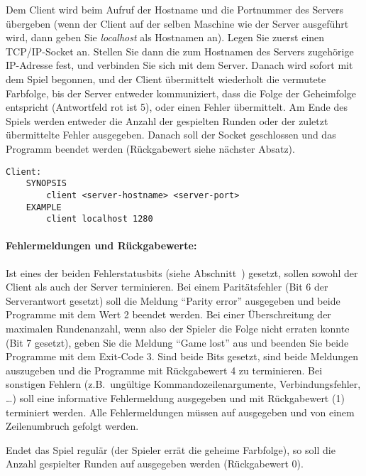 Dem Client wird beim Aufruf der Hostname und die Portnummer des Servers
übergeben (wenn der Client auf der selben Maschine wie der Server ausgeführt
wird, dann geben Sie \emph{localhost} als Hostnamen an). Legen Sie zuerst einen
TCP/IP-Socket an. Stellen Sie dann die zum Hostnamen des Servers zugehörige
IP-Adresse fest, und verbinden Sie sich mit dem Server. Danach wird sofort mit
dem Spiel begonnen, und der Client übermittelt wiederholt die vermutete
Farbfolge, bis der Server entweder kommuniziert, dass die Folge der Geheimfolge
entspricht (Antwortfeld rot ist 5), oder einen Fehler übermittelt. Am Ende des
Spiels werden entweder die Anzahl der gespielten Runden oder der zuletzt
übermittelte Fehler ausgegeben. Danach soll der Socket geschlossen und das
Programm beendet werden (Rückgabewert siehe nächster Absatz).

\begin{verbatim}
Client:
    SYNOPSIS
        client <server-hostname> <server-port>
    EXAMPLE
        client localhost 1280
\end{verbatim}

\paragraph{Fehlermeldungen und Rückgabewerte:} Ist eines der beiden
Fehlerstatusbits (siehe Abschnitt~) gesetzt, sollen sowohl der
Client als auch der Server terminieren. Bei einem Paritätsfehler (Bit $6$ der
Serverantwort gesetzt) soll die Meldung ``Parity error'' ausgegeben und beide
Programme mit dem Wert 2 beendet werden. Bei einer Überschreitung der maximalen
Rundenanzahl, wenn also der Spieler die Folge nicht erraten konnte (Bit 7
gesetzt), geben Sie die Meldung ``Game lost'' aus und beenden Sie beide
Programme mit dem Exit-Code 3. Sind beide Bits gesetzt, sind beide Meldungen
auszugeben und die Programme mit Rückgabewert 4 zu terminieren. Bei sonstigen
Fehlern (z.B.\ ungültige Kommandozeilenargumente, Verbindungsfehler, \ldots)
soll eine informative Fehlermeldung ausgegeben und mit Rückgabewert
 (1) terminiert werden. Alle Fehlermeldungen müssen auf
 ausgegeben und von einem Zeilenumbruch gefolgt werden.

Endet das Spiel regulär (der Spieler errät die geheime Farbfolge), so soll die
Anzahl gespielter Runden auf  ausgegeben werden (Rückgabewert
0).

